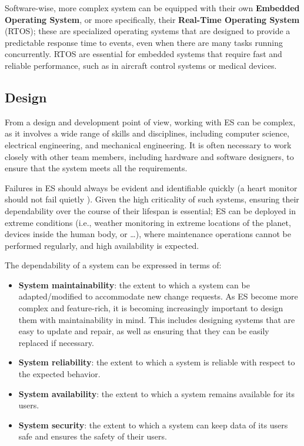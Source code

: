 Software-wise, more complex system can be equipped with their own \textbf{Embedded Operating System}, or more specifically, their \textbf{Real-Time Operating System} (RTOS); these are specialized operating systems that are designed to provide a predictable response time to events, even when there are many tasks running concurrently. RTOS are essential for embedded systems that require fast and reliable performance, such as in aircraft control systems or medical devices.





\subsection{Design}
From a design and development point of view, working with ES can be complex, as it involves a wide range of skills and disciplines, including computer science, electrical engineering, and mechanical engineering. It is often necessary to work closely with other team members, including hardware and software designers, to ensure that the system meets all the requirements.

Failures in ES should always be evident and identifiable quickly (a heart monitor should not fail quietly \cite{MakingEmbeddedSystems}). Given the high criticality of such systems, ensuring their dependability over the course of their lifespan is essential; ES can be deployed in extreme conditions (i.e., weather monitoring in extreme locations of the planet, devices inside the human body, or \dots), where maintenance operations cannot be performed regularly,  and high availability is expected. 

The dependability of a system can be expressed in terms of:
\begin{itemize}
    \item \textbf{System maintainability}: the extent to which a system can be adapted/modified to accommodate new change requests. As ES become more complex and feature-rich, it is becoming increasingly important to design them with maintainability in mind. This includes designing systems that are easy to update and repair, as well as ensuring that they can be easily replaced if necessary.
    \item \textbf{System reliability}: the extent to which a system is reliable with respect to the expected behavior.
    \item \textbf{System availability}: the extent to which a system remains available for its users.
    \item \textbf{System security}: the extent to which a system can keep data of its users safe and ensures the safety of their users.
\end{itemize}

